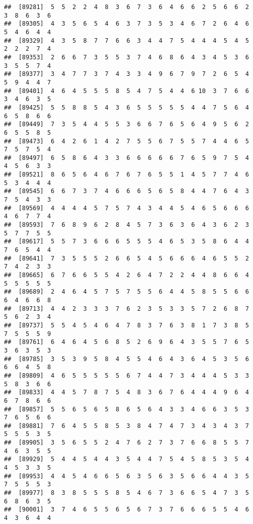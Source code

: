 \documentclass[
]{book}
\begin{document}
\begin{verbatim}
##  [89281]  5  5  2  2  4  8  3  6  7  3  6  4  6  6  2  5  6  6  2  3  8  6  3  6
##  [89305]  4  3  5  6  5  4  6  3  7  3  5  3  4  6  7  2  6  4  6  5  4  6  4  4
##  [89329]  4  3  5  8  7  7  6  6  3  4  4  7  5  4  4  4  5  4  5  2  2  2  7  4
##  [89353]  2  6  6  7  3  5  5  3  7  4  6  8  6  4  3  4  5  3  6  3  5  5  7  4
##  [89377]  3  4  7  7  3  7  4  3  3  4  9  6  7  9  7  2  6  5  4  5  9  4  4  7
##  [89401]  4  6  4  5  5  5  8  5  4  7  5  4  4  6 10  3  7  6  6  3  4  6  3  5
##  [89425]  5  5  8  8  5  4  3  6  5  5  5  5  5  4  4  7  5  6  4  6  5  8  6  6
##  [89449]  7  3  5  4  4  5  5  3  6  6  7  6  5  6  4  9  5  6  2  6  5  5  8  5
##  [89473]  6  4  2  6  1  4  2  7  5  5  6  7  5  5  7  4  4  6  5  7  5  7  5  4
##  [89497]  6  5  8  6  4  3  3  6  6  6  6  6  7  6  5  9  7  5  4  4  5  6  3  3
##  [89521]  8  6  5  6  4  6  7  6  7  6  5  5  1  4  5  7  7  4  6  5  3  4  4  4
##  [89545]  6  6  7  3  7  4  6  6  6  5  6  5  8  4  4  7  6  4  3  7  5  4  3  3
##  [89569]  4  4  4  4  5  7  5  7  4  3  4  4  5  4  6  5  6  6  6  4  6  7  7  4
##  [89593]  7  6  8  9  6  2  8  4  5  7  3  6  3  6  4  3  6  2  3  5  7  7  5  5
##  [89617]  5  5  7  3  6  6  6  5  5  5  4  6  5  3  5  8  6  4  4  7  6  5  4  4
##  [89641]  7  3  5  5  5  2  6  6  5  4  5  6  6  6  4  6  5  5  2  7  4  2  3  3
##  [89665]  6  7  6  6  5  5  4  2  6  4  7  2  2  4  4  8  6  6  4  5  5  5  5  5
##  [89689]  2  4  6  4  5  7  5  7  5  5  6  4  4  5  8  5  5  6  6  6  4  6  6  8
##  [89713]  4  4  2  3  3  3  7  6  2  3  5  3  3  5  7  2  6  8  7  5  6  2  3  4
##  [89737]  5  5  4  5  4  6  4  7  8  3  7  6  3  8  1  7  3  8  5  7  5  5  5  9
##  [89761]  6  4  6  4  5  6  8  5  2  6  9  6  4  3  5  5  7  6  5  3  6  3  5  3
##  [89785]  3  5  3  9  5  8  4  5  5  4  6  4  3  6  4  5  3  5  6  6  6  4  5  8
##  [89809]  4  6  5  5  5  5  5  6  7  4  4  7  3  4  4  4  5  3  3  5  8  3  6  6
##  [89833]  4  4  5  7  8  7  5  4  8  3  6  7  6  4  4  4  9  6  4  6  7  8  6  6
##  [89857]  5  5  6  5  6  5  8  6  5  6  4  3  3  4  6  6  3  5  3  7  6  5  6  6
##  [89881]  7  6  4  5  5  8  5  3  8  4  7  4  7  3  4  3  4  3  7  5  5  5  3  5
##  [89905]  3  5  6  5  5  2  4  7  6  2  7  3  7  6  6  8  5  5  7  4  6  3  5  5
##  [89929]  5  4  4  5  4  4  3  5  4  4  7  5  4  5  8  5  3  5  4  4  5  3  3  5
##  [89953]  4  4  5  4  6  6  5  6  3  5  6  3  5  6  6  4  4  3  5  7  5  5  5  3
##  [89977]  8  3  8  5  5  5  8  5  4  6  7  3  6  6  5  4  7  3  5  6  8  6  3  5
##  [90001]  3  7  4  6  5  5  6  5  6  7  3  7  6  6  6  5  5  4  6  4  3  6  4  4

\end{verbatim}
\end{document}
